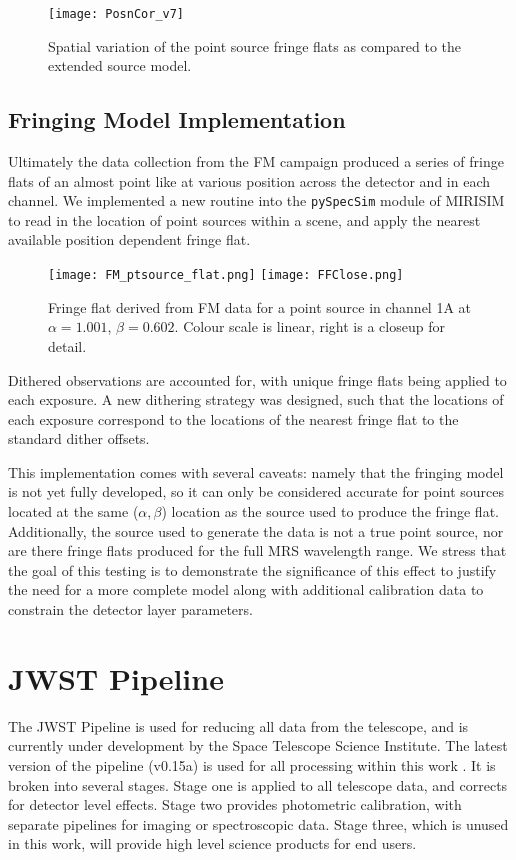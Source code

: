 \begin{figure}[t]
	\centering
	\texttt{[image: PosnCor\_v7]}
	\caption{Spatial variation of the point source fringe flats as compared to the extended source model.}
	\label{fig:fringecor}
\end{figure}
\subsection{Fringing Model Implementation}
Ultimately the data collection from the FM campaign produced a series of fringe flats of an almost point like at various position across the detector and in each channel.
We implemented a new routine into the \verb|pySpecSim| module of MIRISIM to read in the location of point sources within a scene, and apply the nearest available position dependent fringe flat. 

\begin{figure}[t]
	\centering
	\texttt{[image: FM\_ptsource\_flat.png]}
	\texttt{[image: FFClose.png]}	
	\caption{Fringe flat derived from FM data for a point source in channel 1A at $\alpha=1.001$, $\beta=0.602$. Colour scale is linear, right is a closeup for detail.}
	\label{fig:ptsrcfringeflat}
\end{figure}
Dithered observations are accounted for, with unique fringe flats being applied to each exposure.
A new dithering strategy was designed, such that the locations of each exposure correspond to the locations of the nearest fringe flat to the standard dither offsets.

This implementation comes with several caveats: namely that the fringing model is not yet fully developed, so it can only be considered accurate for point sources located at the same ($\alpha,\beta$) location as the source used to produce the fringe flat. Additionally, the source used to generate the data is not a true point source, nor are there fringe flats produced for the full MRS wavelength range.
We stress that the goal of this testing is to demonstrate the significance of this effect to justify the need for a more complete model along with additional calibration data to constrain the detector layer parameters.

\section{JWST Pipeline}
The JWST Pipeline is used for reducing all data from the telescope, and is currently under development by the Space Telescope Science Institute. The latest version of the pipeline (v0.15a) is used for all processing within this work \parencite{Bushouse2015}.
It is broken into several stages. 
Stage one is applied to all telescope data, and corrects for detector level effects.
Stage two provides photometric calibration, with separate pipelines for imaging or spectroscopic data.
Stage three, which is unused in this work, will provide high level science products for end users.%
